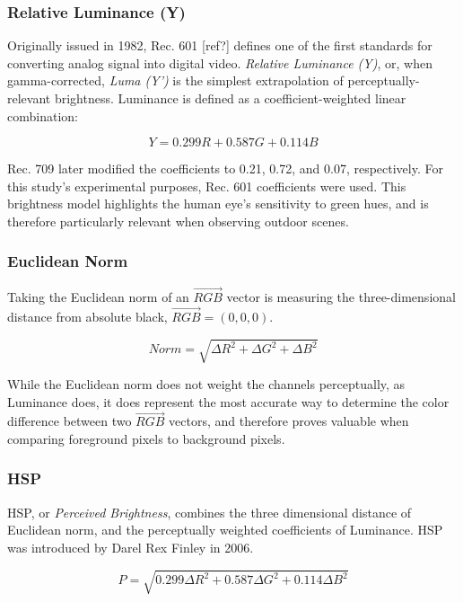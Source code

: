 \subsubsection{Relative Luminance (Y)}

Originally issued in 1982, Rec. 601 [ref?] defines 	one of the first standards for converting analog signal into digital video. \textit{Relative Luminance (Y)}, or, when gamma-corrected, \textit{Luma (Y')} is the simplest extrapolation of perceptually-relevant brightness. Luminance is defined as a coefficient-weighted linear combination:

\begin{equation}
Y = 0.299R + 0.587G + 0.114B
\end{equation}

Rec. 709 later modified the coefficients to 0.21, 0.72, and 0.07, respectively. For this study's experimental purposes, Rec. 601 coefficients were used. This brightness model highlights the human eye's sensitivity to green hues, and is therefore particularly relevant when observing outdoor scenes. 

\subsubsection{Euclidean Norm}

Taking the Euclidean norm of an $\vec{RGB}$ vector is measuring the three-dimensional distance from absolute black, $\vec{RGB} = (0,0,0)$. 

\begin{equation}
Norm = \sqrt{\Delta R^2 + \Delta G^2 + \Delta B^2}
\end{equation}

While the Euclidean norm does not weight the channels perceptually, as Luminance does, it does represent the most accurate way to determine the color difference between two $\vec{RGB}$ vectors, and therefore proves valuable when comparing foreground pixels to background pixels. 

\subsubsection{HSP}

HSP, or \textit{Perceived Brightness}, combines the three dimensional distance of Euclidean norm, and the perceptually weighted coefficients of Luminance. HSP was introduced by Darel Rex Finley in 2006.

\begin{equation}
P = \sqrt{0.299\Delta R^2 + 0.587\Delta G^2 + 0.114\Delta B^2}
\end{equation}

